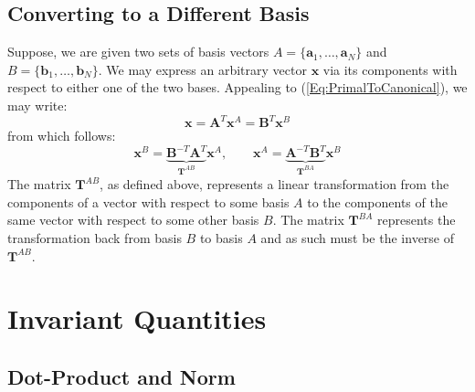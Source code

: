\subsection{Converting to a Different Basis}
Suppose, we are given two sets of basis vectors $A = \{ \mathbf{a}_1, \ldots, \mathbf{a}_N \}$ and $B = \{ \mathbf{b}_1, \ldots, \mathbf{b}_N \}$. We may express an arbitrary vector $\mathbf{x}$ via its components with respect to either one of the two bases. Appealing to (\ref{Eq:PrimalToCanonical}), we may write:
\begin{equation}
 \mathbf{x} = \mathbf{A}^T \mathbf{x}^A = \mathbf{B}^T \mathbf{x}^B
\end{equation}
from which follows:
\begin{equation}
 \mathbf{x}^B = \underbrace{\mathbf{B}^{-T} \mathbf{A}^T}_{\mathbf{T}^{AB}} \mathbf{x}^A, \qquad
 \mathbf{x}^A = \underbrace{\mathbf{A}^{-T} \mathbf{B}^T}_{\mathbf{T}^{BA}} \mathbf{x}^B
\end{equation}
The matrix $\mathbf{T}^{AB}$, as defined above, represents a linear transformation from the components of a vector with respect to some basis $A$ to the components of the same vector with respect to some other basis $B$. The matrix $\mathbf{T}^{BA}$ represents the transformation back from basis $B$ to basis $A$ and as such must be the inverse of $\mathbf{T}^{AB}$.

\section{Invariant Quantities}

\subsection{Dot-Product and Norm}


